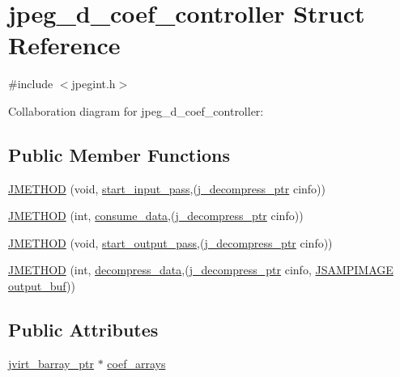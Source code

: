\hypertarget{structjpeg__d__coef__controller}{}\section{jpeg\+\_\+d\+\_\+coef\+\_\+controller Struct Reference}
\label{structjpeg__d__coef__controller}


{\ttfamily \#include $<$jpegint.\+h$>$}



Collaboration diagram for jpeg\+\_\+d\+\_\+coef\+\_\+controller\+:
\subsection*{Public Member Functions}
\begin{DoxyCompactItemize}
\item 
\mbox{\hyperlink{structjpeg__d__coef__controller_ab4b18cfac761c7186363a845e36f342c}{J\+M\+E\+T\+H\+OD}} (void, \mbox{\hyperlink{jdinput_8c_abc0a94e24edf93bc7f914cf4a698a870}{start\+\_\+input\+\_\+pass}},(\mbox{\hyperlink{jpeglib_8h_a00c7d78af44bd26a901c791ccfc1e178}{j\+\_\+decompress\+\_\+ptr}} cinfo))
\item 
\mbox{\hyperlink{structjpeg__d__coef__controller_a4c0e8d307e0852eae338a0f4f3c96edb}{J\+M\+E\+T\+H\+OD}} (int, \mbox{\hyperlink{jdcoefct_8c_a474c99ffcdc94688233e34f65e95c50d}{consume\+\_\+data}},(\mbox{\hyperlink{jpeglib_8h_a00c7d78af44bd26a901c791ccfc1e178}{j\+\_\+decompress\+\_\+ptr}} cinfo))
\item 
\mbox{\hyperlink{structjpeg__d__coef__controller_addb7a363607be97630bf37175267fd58}{J\+M\+E\+T\+H\+OD}} (void, \mbox{\hyperlink{jdcoefct_8c_adf23b9a09770b5e038955fa770f95060}{start\+\_\+output\+\_\+pass}},(\mbox{\hyperlink{jpeglib_8h_a00c7d78af44bd26a901c791ccfc1e178}{j\+\_\+decompress\+\_\+ptr}} cinfo))
\item 
\mbox{\hyperlink{structjpeg__d__coef__controller_a5d61ba56d9f5d8de0662df091aa6d9e1}{J\+M\+E\+T\+H\+OD}} (int, \mbox{\hyperlink{jdcoefct_8c_aeb3959a425ae15d61d141f82da1087aa}{decompress\+\_\+data}},(\mbox{\hyperlink{jpeglib_8h_a00c7d78af44bd26a901c791ccfc1e178}{j\+\_\+decompress\+\_\+ptr}} cinfo, \mbox{\hyperlink{jpeglib_8h_a4bf858e4d42202287e786bdec2f3b62b}{J\+S\+A\+M\+P\+I\+M\+A\+GE}} \mbox{\hyperlink{jdct_8h_ad7e4660a191b1a791748dd44d5a7a0ec}{output\+\_\+buf}}))
\end{DoxyCompactItemize}
\subsection*{Public Attributes}
\begin{DoxyCompactItemize}
\item 
\mbox{\hyperlink{jpeglib_8h_a994f4cba141d82ded90af38e51223f0b}{jvirt\+\_\+barray\+\_\+ptr}} $\ast$ \mbox{\hyperlink{structjpeg__d__coef__controller_a6611f9e18fbbbb13d117caadb5d14dc1}{coef\+\_\+arrays}}
\end{DoxyCompactItemize}



